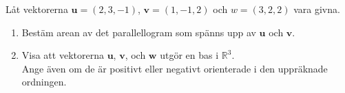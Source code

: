 \documentclass[11pt]{article}
\begin{document}
Låt vektorerna $\mathbf{u} = (2, 3, -1)$, $\mathbf{v} = (1, -1, 2)$ och $w = (3, 2, 2)$ vara givna.
\begin{enumerate}[label=(\alph*)]
    \item Bestäm arean av det parallellogram som spänns upp av $\mathbf{u}$ och $\mathbf{v}$.
    \item Visa att vektorerna $\mathbf{u}$, $\mathbf{v}$, och $\mathbf{w}$ utgör en bas i $\mathbb{R}^3$.\\
        Ange även om de är positivt eller negativt orienterade i den uppräknade ordningen.
\end{enumerate}
\end{document}
